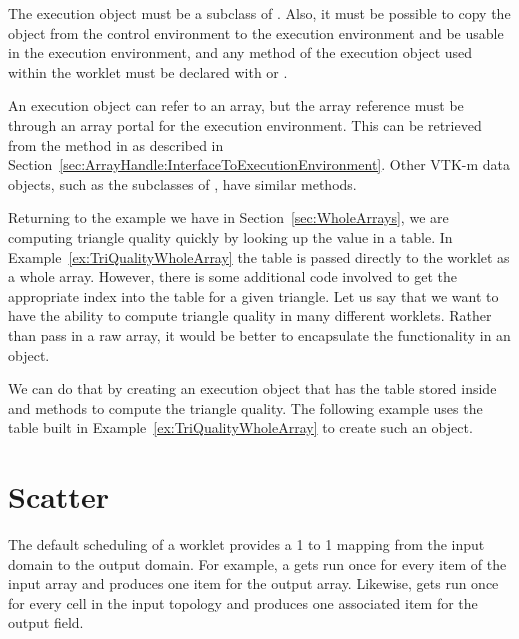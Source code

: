 The execution object must be a subclass of .
Also, it must be possible to copy the object from the control environment
to the execution environment and be usable in the execution environment,
and any method of the execution object used within the worklet must be
declared with \vtkmexecmodifier or \vtkmexeccontmodifier.

An execution object can refer to an array, but the array reference must be
through an array portal for the execution environment. This can be
retrieved from the  method in
 as described in
Section~\ref{sec:ArrayHandle:InterfaceToExecutionEnvironment}. Other VTK-m
data objects, such as the subclasses of , have similar
methods.

Returning to the example we have in Section~\ref{sec:WholeArrays}, we are
computing triangle quality quickly by looking up the value in a table. In
Example~\ref{ex:TriQualityWholeArray} the table is passed directly to the
worklet as a whole array. However, there is some additional code involved
to get the appropriate index into the table for a given triangle. Let us
say that we want to have the ability to compute triangle quality in many
different worklets. Rather than pass in a raw array, it would be better to
encapsulate the functionality in an object.

We can do that by creating an execution object that has the table stored
inside and methods to compute the triangle quality. The following example
uses the table built in Example~\ref{ex:TriQualityWholeArray} to create
such an object.



\section{Scatter}
\label{sec:WorkletScatter}


The default scheduling of a worklet provides a 1 to 1 mapping from the
input domain to the output domain. For example, a
 gets run once for every item of the input
array and produces one item for the output array. Likewise,
 gets run once for every cell in the
input topology and produces one associated item for the output field.

